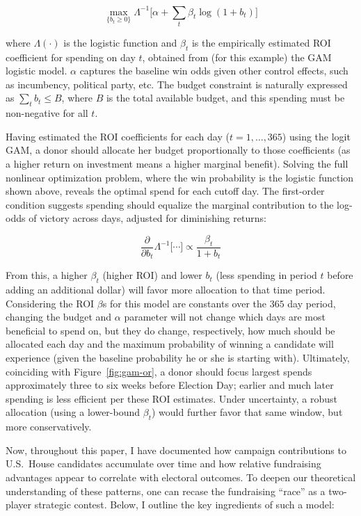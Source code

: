 \[ \underset{\{b_t \geq 0 \}}{\max} \Lambda^{-1} \Big[ \alpha + \sum\limits_t \beta_t \log(1 + b_t) \Big] \]

\noindent where $\Lambda(\cdot)$ is the logistic function and $\beta_t$ is the empirically estimated ROI coefficient for spending on day $t$, obtained from (for this example) the GAM logistic model. $\alpha$ captures the baseline win odds given other control effects, such as incumbency, political party, etc. The budget constraint is naturally expressed as $\sum\limits_t b_t \leq B$, where $B$ is the total available budget, and this spending must be non-negative for all $t$. 

Having estimated the ROI coefficients for each day ($t = 1, \ldots, 365$) using the logit GAM, a donor should allocate her budget proportionally to those coefficients (as a higher return on investment means a higher marginal benefit). Solving the full nonlinear optimization problem, where the win probability is the logistic function shown above, reveals the optimal spend for each cutoff day. The first-order condition suggests spending should equalize the marginal contribution to the log-odds of victory across days, adjusted for diminishing returns:


\[ \dfrac{\partial}{\partial b_t} \Lambda^{-1} \Big[ \cdots \Big] \propto \dfrac{\beta_t}{1 + b_t} \]

From this, a higher $\beta_t$ (higher ROI) and lower $b_t$ (less spending in period $t$ before adding an additional dollar) will favor more allocation to that time period. Considering the ROI $\beta$s for this model are constants over the $365$ day period, changing the budget and $\alpha$ parameter will not change which days are most beneficial to spend on, but they do change, respectively, how much should be allocated each day and the maximum probability of winning a candidate will experience (given the baseline probability he or she is starting with). Ultimately, coinciding with Figure~\ref{fig:gam-or}, a donor should focus largest spends approximately three to six weeks before Election Day; earlier and much later spending is less efficient per these ROI estimates. Under uncertainty, a robust allocation (using a lower-bound $\beta_t$) would further favor that same window, but more conservatively. 

Now, throughout this paper, I have documented how campaign contributions to U.S.\ House candidates accumulate over time and how relative fundraising advantages appear to correlate with electoral outcomes. To deepen our theoretical understanding of these patterns, one can recase the fundraising ``race'' as a two-player strategic contest. Below, I outline the key ingredients of such a model:

